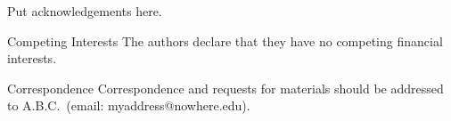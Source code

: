 \documentclass[12pt,twocolumn]{article}
\newenvironment{addendum}{%
    \setlength{\parindent}{0in}%
    \small%
    \begin{list}{Acknowledgements}{%
        \setlength{\leftmargin}{0in}%
        \setlength{\listparindent}{0in}%
        \setlength{\labelsep}{0em}%
        \setlength{\labelwidth}{0in}%
        \setlength{\itemsep}{12pt}%
        \let\makelabel\addendumlabel}
    }
    {\end{list}\normalsize}
\newcommand*{\addendumlabel}[1]{\textbf{#1}\hspace{1em}}
\begin{document}


\begin{addendum}
 \item Put acknowledgements here.
 \item[Competing Interests] The authors declare that they have no
competing financial interests.
 \item[Correspondence] Correspondence and requests for materials
should be addressed to A.B.C.~(email: myaddress@nowhere.edu).
\end{addendum}

\end{document}
